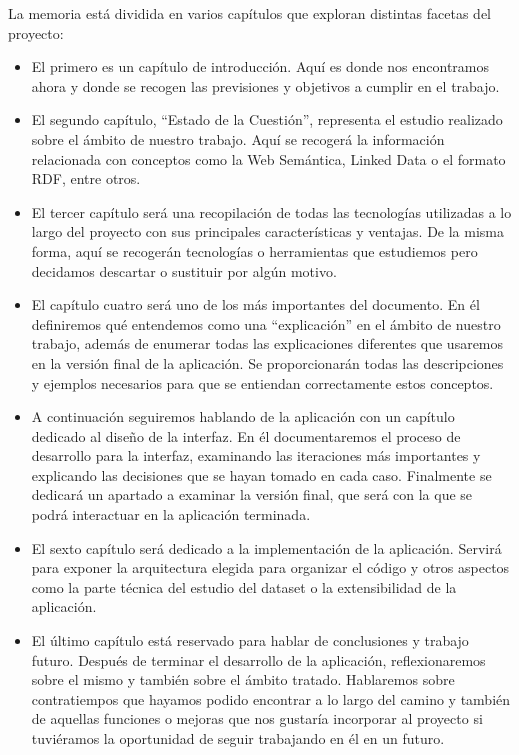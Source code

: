 \clearpage

La memoria está dividida en varios capítulos que exploran distintas facetas del proyecto: \\

\begin{itemize}
\item El primero es un capítulo de introducción. Aquí es donde nos encontramos ahora y donde se recogen las previsiones y objetivos a cumplir en el trabajo. \\

\item El segundo capítulo, “Estado de la Cuestión”, representa el estudio realizado sobre el ámbito de nuestro trabajo. Aquí se recogerá la información relacionada con conceptos como la Web Semántica, Linked Data o el formato RDF, entre otros. \\

\item El tercer capítulo será una recopilación de todas las tecnologías utilizadas a lo largo del proyecto con sus principales características y ventajas. De la misma forma, aquí se recogerán tecnologías o herramientas que estudiemos pero decidamos descartar o sustituir por algún motivo. \\

\item El capítulo cuatro será uno de los más importantes del documento. En él definiremos qué entendemos como una “explicación” en el ámbito de nuestro trabajo, además de enumerar todas las explicaciones diferentes que usaremos en la versión final de la aplicación. Se proporcionarán todas las descripciones y ejemplos necesarios para que se entiendan correctamente estos conceptos. \\

\item A continuación seguiremos hablando de la aplicación con un capítulo dedicado al diseño de la interfaz. En él documentaremos el proceso de desarrollo para la interfaz, examinando las iteraciones más importantes y explicando las decisiones que se hayan tomado en cada caso. Finalmente se dedicará un apartado a examinar la versión final, que será con la que se podrá interactuar en la aplicación terminada. \\

\item El sexto capítulo será dedicado a la implementación de la aplicación. Servirá para exponer la arquitectura elegida para organizar el código y otros aspectos como la parte técnica del estudio del dataset o la extensibilidad de la aplicación. \\

\item El último capítulo está reservado para hablar de conclusiones y trabajo futuro. Después de terminar el desarrollo de la aplicación, reflexionaremos sobre el mismo y también sobre el ámbito tratado. Hablaremos sobre contratiempos que hayamos podido encontrar a lo largo del camino y también de aquellas funciones o mejoras que nos gustaría incorporar al proyecto  si tuviéramos la oportunidad de seguir trabajando en él en un futuro. \\
\end{itemize}